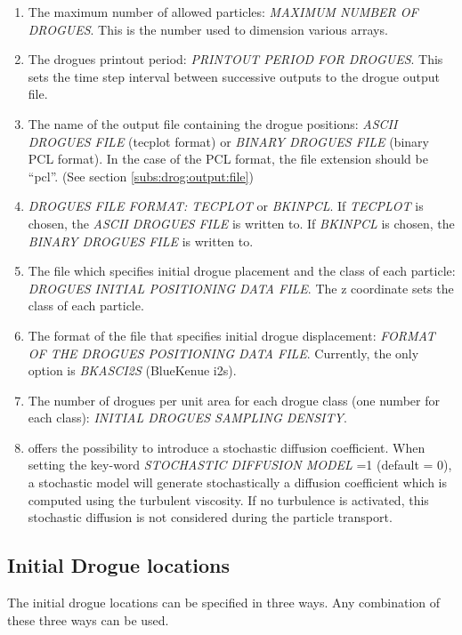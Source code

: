 \begin{enumerate}
\item  The maximum number of allowed particles: \textit{MAXIMUM NUMBER OF DROGUES}.  This is the number used to dimension various arrays.

\item  The drogues printout period: \textit{PRINTOUT PERIOD FOR DROGUES}.  This sets the time step interval between successive outputs to the drogue output file.

\item  The name of the output file containing the drogue positions: \textit{ASCII DROGUES FILE} (tecplot format) or \textit{BINARY DROGUES FILE} (binary PCL format).  In the case of the PCL format, the file extension should be “pcl”.  (See section \ref{subs:drog:output:file})

\item  \textit{DROGUES FILE FORMAT: TECPLOT} or \textit{BKINPCL}.  If \textit{TECPLOT} is chosen, the \textit{ASCII DROGUES FILE} is written to.  If \textit{BKINPCL} is chosen, the \textit{BINARY DROGUES FILE} is written to.

\item  The file which specifies initial drogue placement and the class of each particle:  \textit{DROGUES INITIAL POSITIONING DATA FILE}.  The z coordinate sets the class of each particle.

\item  The format of the file that specifies initial drogue displacement: \textit{FORMAT OF THE DROGUES POSITIONING DATA FILE}.  Currently, the only option is \textit{BKASCI2S} (BlueKenue i2s).

\item  The number of drogues per unit area for each drogue class (one number for each class):  \textit{INITIAL DROGUES SAMPLING DENSITY}.

\item  {} offers the possibility to introduce a stochastic diffusion coefficient. When setting the key-word \textit{STOCHASTIC DIFFUSION MODEL} =1 (default = 0), a stochastic model will generate stochastically a diffusion coefficient which is computed using the turbulent viscosity. If no turbulence is activated, this stochastic diffusion is not considered during the particle transport.
\end{enumerate}

\subsection{ Initial Drogue locations}
\label{subs:drog:init}
The initial drogue locations can be specified in three ways.  Any combination of these three ways can be used.

